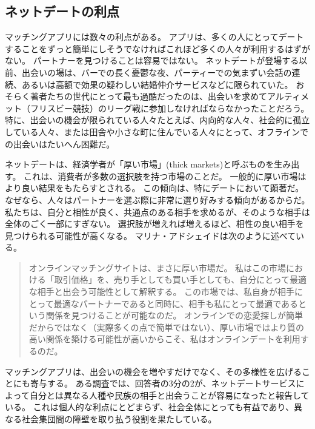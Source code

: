 \documentclass[paper=a4,book,openany]{jlreq} \usepackage{mystyle}
\begin{document}
\subsection{ネットデートの利点}

マッチングアプリには数々の利点がある。
アプリは、多くの人にとってデートすることをずっと簡単にし{\DDASH}そうでなければこれほど多くの人々が利用するはずがない。
パートナーを見つけることは容易ではない。
ネットデートが登場する以前、出会いの場は、バーでの長く憂鬱な夜、パーティーでの気まずい会話の連続、あるいは高額で効果の疑わしい結婚仲介サービスなどに限られていた。
おそらく著者たちの世代にとって最も過酷だったのは、出会いを求めてアルティメット（フリスビー競技）のリーグ戦に参加しなければならなかったことだろう。
特に、出会いの機会が限られている人々{\DDASH}たとえば、内向的な人々、社会的に孤立している人々、または田舎や小さな町に住んでいる人々{\DDASH}にとって、オフラインでの出会いはたいへん困難だ。

ネットデートは、経済学者が「厚い市場」(thick markets)と呼ぶものを生み出す。
これは、消費者が多数の選択肢を持つ市場のことだ。
一般的に厚い市場はより良い結果をもたらすとされる。
この傾向は、特にデートにおいて顕著だ。
なぜなら、人々はパートナーを選ぶ際に非常に選り好みする傾向があるからだ。
私たちは、自分と相性が良く、共通点のある相手を求めるが、そのような相手は全体のごく一部にすぎない。
選択肢が増えれば増えるほど、相性の良い相手を見つけられる可能性が高くなる。
マリナ・アドシェイドは次のように述べている。

\begin{quote}
  オンラインマッチングサイトは、まさに厚い市場だ。
私はこの市場における「取引価格」を、売り手としても買い手としても、自分にとって最適な相手と出会う可能性として解釈する。
この市場では、私自身が相手にとって最適なパートナーであると同時に、相手も私にとって最適であるという関係を見つけることが可能なのだ。
オンラインでの恋愛探しが簡単だからではなく（実際多くの点で簡単ではない）、厚い市場ではより質の高い関係を築ける可能性が高いからこそ、私はオンラインデートを利用するのだ。
\citep[p.8]{adshade13:_dollar_sex}

\end{quote}

マッチングアプリは、出会いの機会を増やすだけでなく、その多様性を広げることにも寄与する。
ある調査では、回答者の3分の2が、ネットデートサービスによって自分とは異なる人種や民族の相手と出会うことが容易になったと報告している\citep{hergovich17:_stren_absen_ties}。
これは個人的な利点にとどまらず、社会全体にとっても有益であり、異なる社会集団間の障壁を取り払う役割を果たしている。
\end{document}
